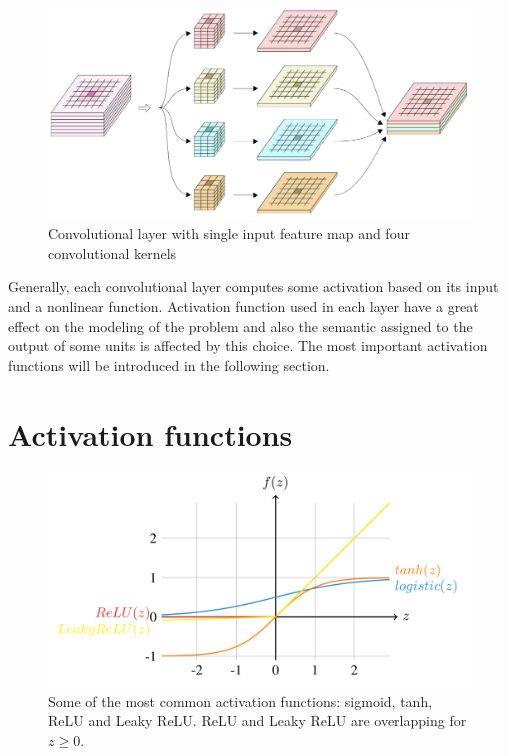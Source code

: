 \begin{figure}
    \begin{center}
        \includegraphics[width=\textwidth]{Figures/2DConvKernels.png}
        \caption{Convolutional layer with single input feature map and four convolutional kernels}
        \label{conv2Dlayer}
    \end{center}
\end{figure}


Generally, each convolutional layer computes some activation based on its input and a nonlinear function. Activation function used in each layer have a great effect on the modeling of the problem and also the semantic assigned to the output of some units is affected by this choice. The most important activation functions will be introduced in the following section.

\section{Activation functions}\label{sec:activations}
\begin{figure}
\centering
\includegraphics[width=\textwidth]{Figures/Actfuncs.png}
\caption{Some of the most common activation functions: sigmoid, tanh, ReLU and Leaky ReLU. ReLU and Leaky ReLU are overlapping for $z \geq 0$.}
\label{fig:activations}
\end{figure}

